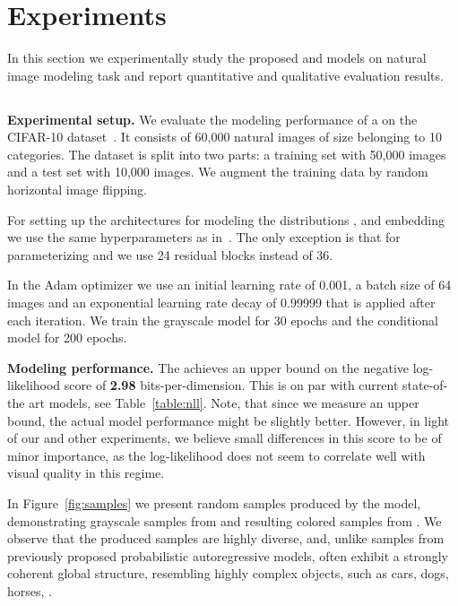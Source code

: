 \section{Experiments}\label{sec:experiments}

In this section we experimentally study the 
proposed \GRAY and \PYRAMID models on natural image modeling task
and report quantitative and qualitative evaluation results. 

\subsection{\GRAY} 

\textbf{Experimental setup.} We evaluate the modeling performance of 
a \GRAY on the CIFAR-10 dataset~\cite{krizhevsky2009learning}.
It consists of 60,000 natural images of size  belonging 
to 10 categories.
The dataset is split into two parts: a training set with 50,000 images 
and a test set with 10,000 images.
We augment the training data by random horizontal image flipping.

For setting up the architectures for modeling the distributions 
, 
and embedding  we use the same hyperparameters as in~\cite{salimans2016pixel}.
The only exception is that for parameterizing  and 
we use 24 residual blocks instead of 36.

In the Adam optimizer we use an initial learning rate of 0.001, a batch size of 
64 images and an exponential learning rate decay of 0.99999 that is applied after each iteration.
We train the grayscale model  for 30 epochs
and the conditional model  for 200 epochs.

\textbf{Modeling performance.} The \GRAY achieves an upper bound 
on the negative log-likelihood score of \textbf{2.98} bits-per-dimension.
This is on par with current state-of-the art models, see Table~\ref{table:nll}.
Note, that since we measure an upper bound, the actual model performance might 
be slightly better. However, in light of our and other experiments, we believe 
small differences in this score to be of minor importance, as the log-likelihood 
does not seem to correlate well with visual quality in this regime. 

In Figure~\ref{fig:samples} we present random samples produced 
by the \GRAY model, demonstrating grayscale samples from 
 and resulting colored samples from .
We observe that the produced samples are highly diverse, and, unlike samples 
from previously proposed probabilistic autoregressive models, often exhibit a 
strongly coherent global structure, resembling highly complex objects, such as 
cars, dogs, horses, \etc.


